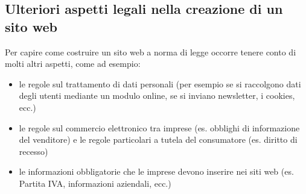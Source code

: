 \subsection{Ulteriori aspetti legali nella creazione di un sito web}
Per capire come costruire un sito web a norma di legge occorre tenere conto di molti altri aspetti, come ad esempio:
\begin{itemize}
    \item le regole sul trattamento di dati personali (per esempio se si raccolgono dati degli utenti
    mediante un modulo online, se si inviano newsletter, i cookies, ecc.)
    \item le regole sul commercio elettronico tra imprese (es. obblighi di informazione del venditore) e le regole
    particolari a tutela del consumatore (es. diritto di recesso)
    \item le informazioni obbligatorie che le imprese devono inserire nei siti web (es. Partita IVA, informazioni aziendali,
    ecc.)
\end{itemize}
